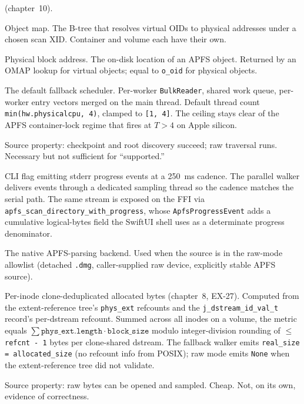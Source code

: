 \begin{description}
    (chapter~10).
  \item[OMAP.] Object map. The B-tree that resolves virtual OIDs
    to physical addresses under a chosen scan XID. Container and
    volume each have their own.
  \item[Paddr.] Physical block address. The on-disk location of an
    APFS object. Returned by an OMAP lookup for virtual objects;
    equal to \texttt{o\_oid} for physical objects.
  \item[Parallel walker.] The default fallback scheduler.
    Per-worker \texttt{BulkReader}, shared work queue, per-worker
    entry vectors merged on the main thread. Default thread count
    \texttt{min(hw.physicalcpu, 4)}, clamped to \texttt{[1, 4]}.
    The ceiling stays clear of the APFS container-lock regime
    that fires at $T > 4$ on Apple silicon.
  \item[Parsable.] Source property: checkpoint and root discovery
    succeed; raw traversal runs. Necessary but not sufficient for
    ``supported.''
  \item[\texttt{-{}-progress}.] CLI flag emitting stderr
    progress events at a 250~ms cadence. The parallel walker
    delivers events through a dedicated sampling thread so the
    cadence matches the serial path. The same stream is exposed
    on the FFI via \texttt{apfs\_scan\_directory\_with\_progress},
    whose \texttt{ApfsProgressEvent} adds a cumulative
    logical-bytes field the SwiftUI shell uses as a determinate
    progress denominator.
  \item[Raw mode.] The native APFS-parsing backend. Used when the
    source is in the raw-mode allowlist (detached \texttt{.dmg},
    caller-supplied raw device, explicitly stable APFS source).
  \item[Real size.] Per-inode clone-deduplicated allocated bytes
    (chapter~8, EX-27). Computed from the extent-reference tree's
    \texttt{phys\_ext} refcounts and the \texttt{j\_dstream\_id\_val\_t}
    record's per-dstream refcount. Summed across all inodes on a
    volume, the metric equals
    $\sum \texttt{phys\_ext.length} \cdot \texttt{block\_size}$
    modulo integer-division rounding of $\leq$
    \texttt{refcnt - 1} bytes per clone-shared dstream. The
    fallback walker emits
    \texttt{real\_size = allocated\_size} (no refcount info from
    POSIX); raw mode emits \texttt{None} when the
    extent-reference tree did not validate.
  \item[Readable.] Source property: raw bytes can be opened and
    sampled. Cheap. Not, on its own, evidence of correctness.

\end{description}
